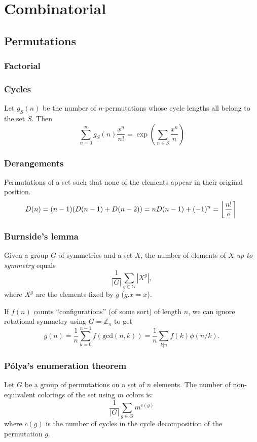 \chapter{Combinatorial}

\section{Permutations}
	\subsection{Factorial}
		

	\subsection{Cycles}
		Let $g_S(n)$ be the number of $n$-permutations whose cycle lengths all belong to the set $S$. Then
		$$\sum_{n=0} ^\infty g_S(n) \frac{x^n}{n!} = \exp\left(\sum_{n\in S} \frac{x^n} {n} \right)$$

	\subsection{Derangements}
		Permutations of a set such that none of the elements appear in their original position.
		\[ \mkern-2mu D(n) = (n-1)(D(n-1)+D(n-2)) = n D(n-1)+(-1)^n = \left\lfloor\frac{n!}{e}\right\rceil \]

	\subsection{Burnside's lemma}
		Given a group $G$ of symmetries and a set $X$, the number of elements of $X$ \emph{up to symmetry} equals
		 \[ {\frac {1}{|G|}}\sum _{{g\in G}}|X^{g}|, \]
		 where $X^{g}$ are the elements fixed by $g$ ($g.x = x$).

		 If $f(n)$ counts ``configurations'' (of some sort) of length $n$, we can ignore rotational symmetry using $G = \mathbb Z_n$ to get
		 \[ g(n) = \frac 1 n \sum_{k=0}^{n-1}{f(\text{gcd}(n, k))} = \frac 1 n \sum_{k|n}{f(k)\phi(n/k)}. \]
	
	\subsection{Pólya's enumeration theorem}
        Let $G$ be a group of permutations on a set of $n$ elements. The number of non-equivalent colorings of the set using $m$ colors is:
        \[ \frac{1}{|G|} \sum_{g \in G} m^{c(g)} \]
        where $c(g)$ is the number of cycles in the cycle decomposition of the permutation $g$.

